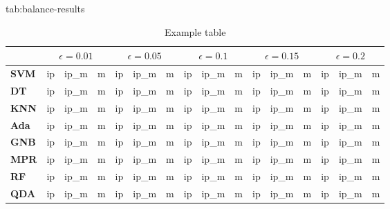 \begin{table}[htbp]
\scriptsize
\floatconts
  {tab:balance-results}%
  {\caption{Example table}}%
  {
\begin{tabular}{l|lll|lll|lll|lll|lll}
             & \multicolumn{3}{c|}{$\epsilon=0.01$} & \multicolumn{3}{c|}{$\epsilon=0.05$} & \multicolumn{3}{c|}{$\epsilon=0.1$} & \multicolumn{3}{c}{$\epsilon=0.15$} & \multicolumn{3}{c|}{$\epsilon=0.2$} \\
\hline
\textbf{SVM} & ip         & ip\_m      & m          & ip         & ip\_m      & m          & ip         & ip\_m      & m          & ip         & ip\_m      & m          & ip         & ip\_m      & m           \\

\hline
\textbf{DT}  & ip         & ip\_m      & m          & ip         & ip\_m      & m          & ip         & ip\_m      & m          & ip         & ip\_m      & m          & ip         & ip\_m      & m           \\

\hline
\textbf{KNN} & ip         & ip\_m      & m          & ip         & ip\_m      & m          & ip         & ip\_m      & m          & ip         & ip\_m      & m          & ip         & ip\_m      & m           \\

\hline
\textbf{Ada} & ip         & ip\_m      & m          & ip         & ip\_m      & m          & ip         & ip\_m      & m          & ip         & ip\_m      & m          & ip         & ip\_m      & m           \\

\hline
\textbf{GNB} & ip         & ip\_m      & m          & ip         & ip\_m      & m          & ip         & ip\_m      & m          & ip         & ip\_m      & m          & ip         & ip\_m      & m           \\

\hline
\textbf{MPR} & ip         & ip\_m      & m          & ip         & ip\_m      & m          & ip         & ip\_m      & m          & ip         & ip\_m      & m          & ip         & ip\_m      & m           \\

\hline
\textbf{RF}  & ip         & ip\_m      & m          & ip         & ip\_m      & m          & ip         & ip\_m      & m          & ip         & ip\_m      & m          & ip         & ip\_m      & m           \\

\hline
\textbf{QDA} & ip         & ip\_m      & m          & ip         & ip\_m      & m          & ip         & ip\_m      & m          & ip         & ip\_m      & m          & ip         & ip\_m      & m           \\

\hline
\end{tabular}

  }
\end{table}
